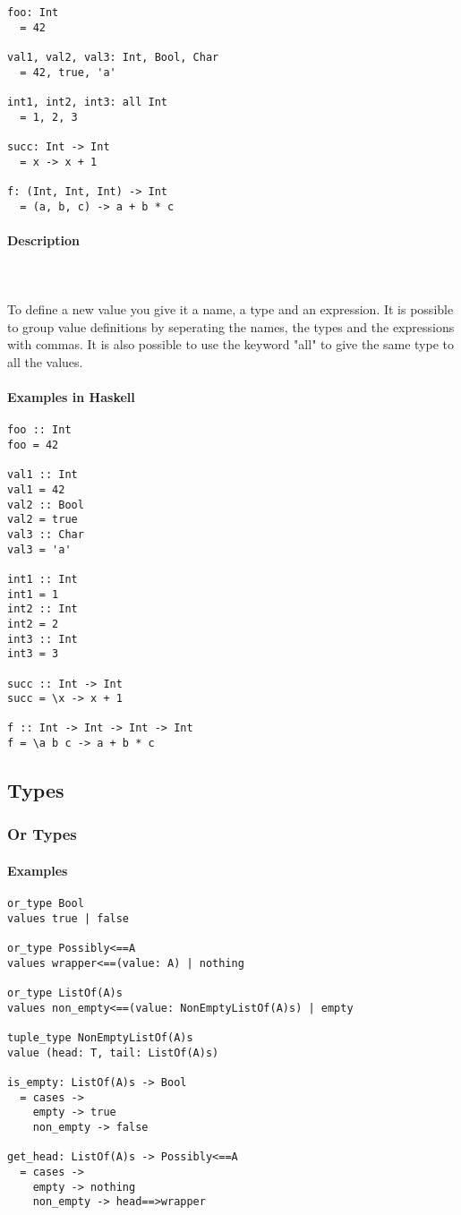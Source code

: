 \documentclass{article}
\def\H{Haskell}
\begin{document}
\begin{verbatim}
foo: Int
  = 42

val1, val2, val3: Int, Bool, Char
  = 42, true, 'a'

int1, int2, int3: all Int
  = 1, 2, 3

succ: Int -> Int
  = x -> x + 1

f: (Int, Int, Int) -> Int
  = (a, b, c) -> a + b * c
\end{verbatim}

\paragraph{Description}\mbox{} \\\\
To define a new value you give it a name, a type and an expression. It is possible
to group value definitions by seperating the names, the types and the expressions
with commas. It is also possible to use the keyword "all" to give the same type
to all the values.

\paragraph{Examples in \H}

\begin{verbatim}
foo :: Int
foo = 42

val1 :: Int
val1 = 42
val2 :: Bool
val2 = true
val3 :: Char
val3 = 'a'

int1 :: Int
int1 = 1
int2 :: Int
int2 = 2
int3 :: Int
int3 = 3

succ :: Int -> Int
succ = \x -> x + 1

f :: Int -> Int -> Int -> Int
f = \a b c -> a + b * c
\end{verbatim}

\subsection{Types}

\subsubsection{Or Types}

\paragraph{Examples}

\begin{verbatim}
or_type Bool
values true | false

or_type Possibly<==A
values wrapper<==(value: A) | nothing

or_type ListOf(A)s
values non_empty<==(value: NonEmptyListOf(A)s) | empty

tuple_type NonEmptyListOf(A)s
value (head: T, tail: ListOf(A)s)

is_empty: ListOf(A)s -> Bool
  = cases -> 
    empty -> true
    non_empty -> false

get_head: ListOf(A)s -> Possibly<==A
  = cases -> 
    empty -> nothing
    non_empty -> head==>wrapper
\end{verbatim}
\end{document}
